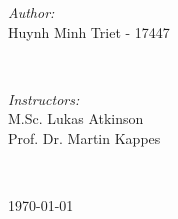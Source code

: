 \begin{titlepage}

\begin{minipage}{0.4\textwidth}
\begin{flushleft} \large
\emph{Author:}\\
Huynh Minh Triet - 17447\\

\end{flushleft}
\end{minipage}
~
\begin{minipage}{0.55\textwidth}
\begin{flushright} \large
\emph{Instructors:} \\
M.Sc. Lukas Atkinson\\
Prof. Dr. Martin Kappes 
\end{flushright}
\end{minipage}\\[2cm]
\makeatother


{\large \today}\\[2cm] %

\vfill %

\end{titlepage}
